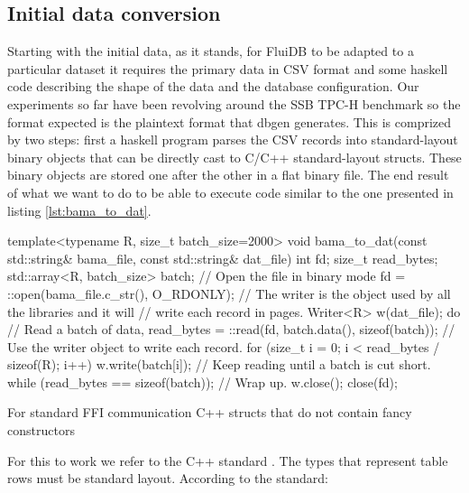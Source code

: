\subsection{Initial data conversion}

Starting with the initial data, as it stands, for FluiDB to be adapted
to a particular dataset it requires the primary data in CSV format and
some haskell code describing the shape of the data and the database
configuration. Our experiments so far have been revolving around the
SSB TPC-H benchmark so the format expected is the plaintext format
that dbgen \cite{perivolaropoulosFakedrakeSsbdbgen2021}
generates. This is comprized by two steps: first a haskell program
parses the CSV records into standard-layout binary objects that can be
directly cast to C/C++ standard-layout structs. These binary objects
are stored one after the other in a flat binary file. The end result
of what we want to do to be able to execute code similar to the one
presented in listing \ref{lst:bama_to_dat}.

\begin{code}
\begin{cppcode}
template<typename R, size_t batch_size=2000>
void bama_to_dat(const std::string& bama_file, const std::string& dat_file) {
  int fd;
  size_t read_bytes;
  std::array<R, batch_size> batch;
  // Open the file in binary mode
  fd = ::open(bama_file.c_str(), O_RDONLY);
  // The writer is the object used by all the libraries and it will
  // write each record in pages.
  Writer<R> w(dat_file);
  do {
    // Read a batch of data,
    read_bytes = ::read(fd, batch.data(), sizeof(batch));
    // Use the writer object to write each record.
    for (size_t i = 0; i < read_bytes / sizeof(R); i++) {
      w.write(batch[i]);
    }
    // Keep reading until a batch is cut short.
  } while (read_bytes == sizeof(batch));
  // Wrap up.
  w.close();
  close(fd);
}
\end{cppcode}
  \caption{\label{lst:bama_to_dat}For standard FFI communication C++
    structs that do not contain fancy constructors}
\end{code}

For this to work we refer to the C++ standard
\cite{14:00-17:00ISOIEC14882}. The types that represent table rows must
be standard layout. According to the standard:

